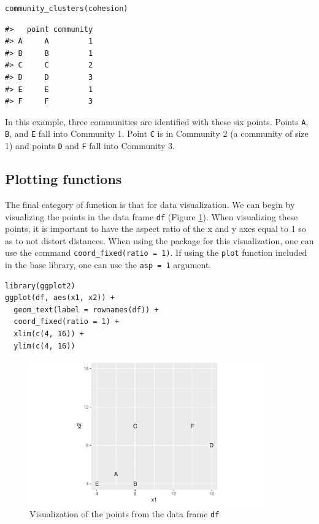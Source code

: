 \begin{verbatim}
community_clusters(cohesion)
\end{verbatim}

\begin{verbatim}
#>   point community
#> A     A         1
#> B     B         1
#> C     C         2
#> D     D         3
#> E     E         1
#> F     F         3
\end{verbatim}

In this example, three communities are identified with these six points. Points \texttt{A}, \texttt{B}, and \texttt{E} fall into Community 1. Point \texttt{C} is in Community 2 (a community of size 1) and points \texttt{D} and \texttt{F} fall into Community 3.

\hypertarget{plotting-functions}{%
\subsection{Plotting functions}\label{plotting-functions}}

The final category of function is that for data visualization. We can begin by visualizing the points in the data frame \texttt{df} (Figure \ref{fig:fig1}). When visualizing these points, it is important to have the aspect ratio of the x and y axes equal to 1 so as to not distort distances. When using the  package for this visualization, one can use the command \texttt{coord\_fixed(ratio\ =\ 1)}. If using the \texttt{plot} function included in the base library, one can use the \texttt{asp\ =\ 1} argument.

\begin{verbatim}
library(ggplot2)
ggplot(df, aes(x1, x2)) +
  geom_text(label = rownames(df)) +
  coord_fixed(ratio = 1) +
  xlim(c(4, 16)) +
  ylim(c(4, 16))
\end{verbatim}

\begin{figure}[H]
\centering
\includegraphics[width=4in,trim=0in 0in 0in 0in,clip]{dagostino-mcgowan_files/figure-latex/fig1-1}

\caption{Visualization of the points from the data frame \texttt{df}}\label{fig:fig1}
\end{figure}

